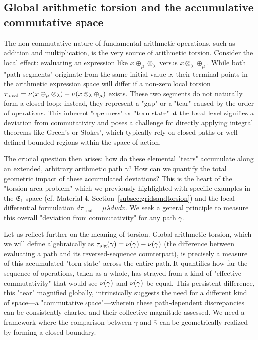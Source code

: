 \subsection{Global arithmetic torsion and the accumulative commutative space}
\label{sec:global_torsion_acs_narrative_enhanced_lc}

The non-commutative nature of fundamental arithmetic operations, such as addition and multiplication, is the very source of arithmetic torsion. Consider the local effect: evaluating an expression like $x \oplus_\mu \otimes_\lambda$ versus $x \otimes_\lambda \oplus_\mu$. While both "path segments" originate from the same initial value $x$, their terminal points in the arithmetic expression space will differ if a non-zero local torsion $\tau_{\text{local}} = \nu(x \oplus_\mu \otimes_\lambda) - \nu(x \otimes_\lambda \oplus_\mu)$ exists. These two segments do not naturally form a closed loop; instead, they represent a "gap" or a "tear" caused by the order of operations. This inherent "openness" or "torn state" at the local level signifies a deviation from commutativity and poses a challenge for directly applying integral theorems like Green's or Stokes', which typically rely on closed paths or well-defined bounded regions within the space of action.

The crucial question then arises: how do these elemental "tears" accumulate along an extended, arbitrary arithmetic path $\gamma$? How can we quantify the total geometric impact of these accumulated deviations? This is the heart of the "torsion-area problem" which we previously highlighted with specific examples in the $\mathfrak{E}_1$ space (cf. Material 4, Section~\ref{subsec:gridsandtorsion}) and the local differential formulation $d\tau_{\text{local}} = \mu \lambda du dv$. We seek a general principle to measure this overall "deviation from commutativity" for any path $\gamma$.

Let us reflect further on the meaning of torsion. Global arithmetic torsion, which we will define algebraically as $\tau_{\text{alg}}(\gamma) = \nu(\gamma) - \nu(\bar{\gamma})$ (the difference between evaluating a path and its reversed-sequence counterpart), is precisely a measure of this accumulated "torn state" across the entire path. It quantifies how far the sequence of operations, taken as a whole, has strayed from a kind of "effective commutativity" that would see $\nu(\gamma)$ and $\nu(\bar{\gamma})$ be equal. This persistent difference, this "tear" magnified globally, intrinsically suggests the need for a different kind of space—a "commutative space"—wherein these path-dependent discrepancies can be consistently charted and their collective magnitude assessed. We need a framework where the comparison between $\gamma$ and $\bar{\gamma}$ can be geometrically realized by forming a closed boundary.

